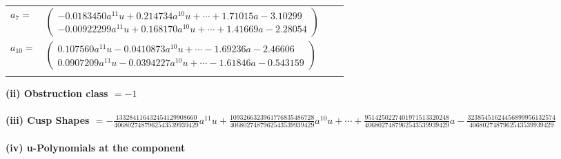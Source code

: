 \documentclass[1p]{elsarticle_modified}
\theoremstyle{definition}
\begin{document}
\begin{tabular}{m{7pt} m{180pt} m{7pt} m{180pt} }
\flushright $a_{7}=$&$\begin{pmatrix}-0.0183450 a^{11} u+0.214734 a^{10} u+\cdots+1.71015 a-3.10299\\-0.00922299 a^{11} u+0.168170 a^{10} u+\cdots+1.41669 a-2.28054\end{pmatrix}$ \\
\flushright $a_{10}=$&$\begin{pmatrix}0.107560 a^{11} u-0.0410873 a^{10} u+\cdots-1.69236 a-2.46606\\0.0907209 a^{11} u-0.0394227 a^{10} u+\cdots-1.61846 a-0.543159\end{pmatrix}$\\&\end{tabular}
\flushleft \textbf{(ii) Obstruction class $= -1$}\\~\\
\flushleft \textbf{(iii) Cusp Shapes $= -\frac{133284116432454129908660}{4068027487962543539939429} a^{11} u+\frac{1093266323961776835486728}{4068027487962543539939429} a^{10} u+\cdots+\frac{9514250227401971513320248}{4068027487962543539939429} a-\frac{32385451624456899956132574}{4068027487962543539939429}$}\\~\\
\newpage\renewcommand{\arraystretch}{1}
\flushleft \textbf{(iv) u-Polynomials at the component}\newline \\
\end{document}
